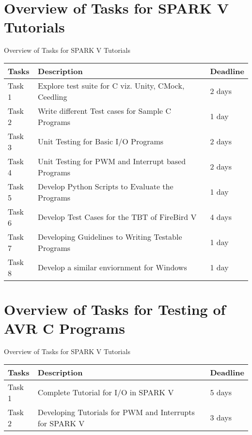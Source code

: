 \documentclass[10pt, a4paper]{beamer}
\begin{document}
\section{Overview of Tasks for SPARK V Tutorials}
\begin{frame}{Overview of Tasks for SPARK V Tutorials}
	\begin{center}
	\begin{tabular}{ |p{2cm}|p{5cm}|p{1.5cm}| }
	\hline
 	 Tasks & Description & Deadline \\
	\hline
 	 Task 1 & Explore test suite for C viz. Unity, CMock, Ceedling & 2 days \\ 
	\hline
	 Task 2 & Write different Test cases for Sample C Programs & 1 day \\ 
	\hline
	 Task 3 & Unit Testing for Basic I/O Programs & 2 days \\ 
	\hline
	 Task 4 & Unit Testing for PWM and Interrupt based Programs & 2 days \\ 
	\hline
	 Task 5 & Develop Python Scripts to Evaluate the Programs & 1 day \\ 
	\hline
	 Task 6 & Develop Test Cases for the TBT of FireBird V & 4 days \\ 
	\hline
 	 Task 7 & Developing Guidelines to Writing Testable Programs & 1 day \\
	\hline
	 Task 8 & Develop a similar enviornment for Windows & 1 day \\
	\hline
	\end{tabular}
	\end{center}
\end{frame}


\section{Overview of Tasks for Testing of AVR C Programs}
\begin{frame}{Overview of Tasks for SPARK V Tutorials}
	\begin{center}
	\begin{tabular}{ |p{2cm}|p{5cm}|p{1.5cm}| }
	\hline
 	 Tasks & Description & Deadline \\
	\hline
 	 Task 1 & Complete Tutorial for I/O in SPARK V & 5 days \\ 
	\hline
	 Task 2 & Developing Tutorials for PWM and Interrupts for SPARK V & 3 days \\ 
	\hline
	\end{tabular}
	\end{center}
\end{frame}
\end{document}
